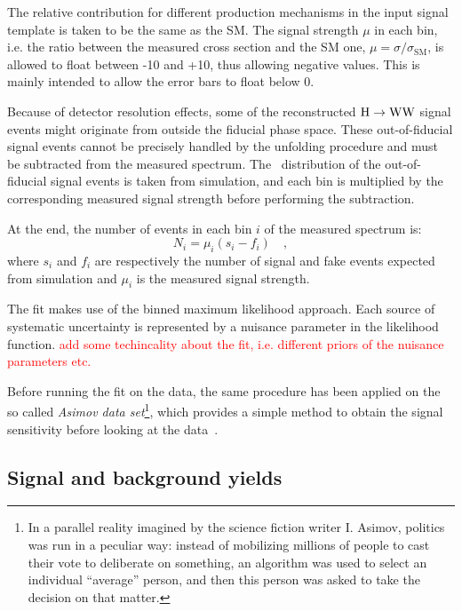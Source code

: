 The relative contribution for different production mechanisms in the input signal template is taken to be the same as the SM.
The signal strength $\mu$ in each bin, i.e. the ratio between the measured cross section and the SM one, $\mu = \sigma/\sigma_\mathrm{SM}$, is allowed to float between -10 and +10, thus allowing negative values. This is mainly intended to allow the error bars to float below 0.

Because of detector resolution effects, some of the reconstructed ${\mathrm{H}\to\mathrm{WW}}$ signal events might originate from outside the fiducial phase space.  
These out-of-fiducial signal events cannot be precisely handled by the unfolding procedure and must be subtracted from the measured spectrum. The \pth~distribution of the out-of-fiducial signal events is taken from simulation, and each bin is multiplied by the corresponding measured signal strength before performing the subtraction. 

At the end, the number of events in each bin $i$ of the measured spectrum is:
\begin{equation}
N_i = \mu_i (s_i -f_i) \quad ,
\end{equation}
where $s_i$ and $f_i$ are respectively the number of signal and fake events expected from simulation and $\mu_i$ is the measured signal strength.

The fit makes use of the binned maximum likelihood approach. Each source of systematic uncertainty is represented by a nuisance parameter in the likelihood function. \textcolor{red}{add some techincality about the fit, i.e. different priors of the nuisance parameters etc.}

Before running the fit on the data, the same procedure has been applied on the so called \textit{Asimov data set}\footnote{In a parallel reality imagined by the science fiction writer I. Asimov, politics was run in a peculiar way: instead of mobilizing millions of people to cast their vote to deliberate on something, an algorithm was used to select an individual ``average'' person, and then this person was asked to take the decision on that matter.}, which provides a simple method to obtain the signal sensitivity before looking at the data~\cite{Cowan:2010js}.


\subsection{Signal and background yields}\label{subsec:yields}




